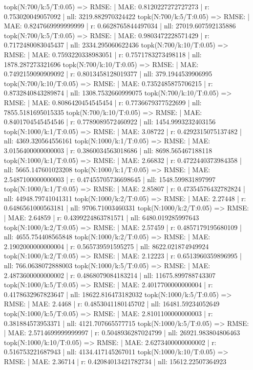 topk(N:700/k:5/T:0.05) => RMSE: | MAE: 0.8120227272727273 | r: 0.753020049057092 | nll: 3219.882970324422
topk(N:700/k:5/T:0.05) => RMSE: | MAE: 0.8247669999999999 | r: 0.6628765844497034 | nll: 27019.607592135886
topk(N:700/k:5/T:0.05) => RMSE: | MAE: 0.9803472228571429 | r: 0.7172480083045437 | nll: 2334.295060622436
topk(N:700/k:10/T:0.05) => RMSE: | MAE: 0.7593220338983051 | r: 0.7571783273498118 | nll: 1878.287273321696
topk(N:700/k:10/T:0.05) => RMSE: | MAE: 0.7492159090909092 | r: 0.8013458128019377 | nll: 379.1944539906995
topk(N:700/k:10/T:0.05) => RMSE: | MAE: 0.7352485875706215 | r: 0.8732840843289874 | nll: 1308.7532660999075
topk(N:700/k:10/T:0.05) => RMSE: | MAE: 0.8086420454545454 | r: 0.7736679377522699 | nll: 7855.5181695015335
topk(N:700/k:10/T:0.05) => RMSE: | MAE: 0.8401704545454546 | r: 0.7789089572460922 | nll: 1454.9993232403156
topk(N:1000/k:1/T:0.05) => RMSE: | MAE: 3.08722 | r: 0.4292315075137482 | nll: 4369.320564556161
topk(N:1000/k:1/T:0.05) => RMSE: | MAE: 3.0156400000000003 | r: 0.3860034563018686 | nll: 8698.565467188118
topk(N:1000/k:1/T:0.05) => RMSE: | MAE: 2.66832 | r: 0.4722440373984358 | nll: 5665.147601023208
topk(N:1000/k:1/T:0.05) => RMSE: | MAE: 2.5487100000000003 | r: 0.47455705736698645 | nll: 1548.599831897997
topk(N:1000/k:1/T:0.05) => RMSE: | MAE: 2.85807 | r: 0.47354576432782824 | nll: 44948.79741041311
topk(N:1000/k:2/T:0.05) => RMSE: | MAE: 2.27448 | r: 0.6486561000563181 | nll: 9706.71003460331
topk(N:1000/k:2/T:0.05) => RMSE: | MAE: 2.64859 | r: 0.4399224863781571 | nll: 6480.019285997643
topk(N:1000/k:2/T:0.05) => RMSE: | MAE: 2.57459 | r: 0.4857179195680109 | nll: 4655.754408565848
topk(N:1000/k:2/T:0.05) => RMSE: | MAE: 2.1902000000000004 | r: 0.565739591595275 | nll: 8622.021874949924
topk(N:1000/k:2/T:0.05) => RMSE: | MAE: 2.12223 | r: 0.6513960359896995 | nll: 766.0638072888003
topk(N:1000/k:5/T:0.05) => RMSE: | MAE: 2.4873600000000002 | r: 0.4868079084183214 | nll: 11675.899788743307
topk(N:1000/k:5/T:0.05) => RMSE: | MAE: 2.4017700000000004 | r: 0.4178632967823647 | nll: 18622.816473182032
topk(N:1000/k:5/T:0.05) => RMSE: | MAE: 2.4468 | r: 0.4853041180145702 | nll: 16481.59234052649
topk(N:1000/k:5/T:0.05) => RMSE: | MAE: 2.8101100000000003 | r: 0.381884573953371 | nll: 4121.707665577715
topk(N:1000/k:5/T:0.05) => RMSE: | MAE: 2.5714699999999997 | r: 0.5048936287024799 | nll: 26921.983804806463
topk(N:1000/k:10/T:0.05) => RMSE: | MAE: 2.6273400000000002 | r: 0.516753221687943 | nll: 4134.417145267011
topk(N:1000/k:10/T:0.05) => RMSE: | MAE: 2.36714 | r: 0.42084013421782734 | nll: 15612.22507364923
